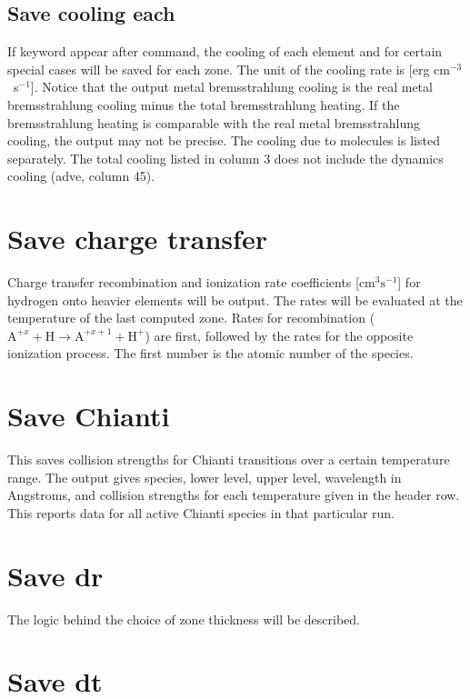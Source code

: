 \subsection{Save cooling each}

If keyword  appear after 
command, the cooling of each element and for certain
special cases will be saved for each zone. 
The unit of the cooling rate is [erg cm$^{-3}$~s$^{-1}$]. 
Notice that the output metal bremsstrahlung cooling is the real 
metal bremsstrahlung cooling minus the total bremsstrahlung heating. If the
bremsstrahlung heating is comparable with the real metal bremsstrahlung cooling,
the output may not be precise.
The cooling due to molecules is listed separately. The total cooling
listed in column 3 does not include the dynamics cooling (adve, column 45).

\section{Save charge transfer}

Charge transfer recombination and ionization rate coefficients
   [cm$^3\mathrm{s}^{-1}$]
for hydrogen onto heavier elements will be output.  The rates will be
evaluated at the temperature of the last computed zone.  Rates for
recombination (${\mathrm{A}}^{ + x}  + {\mathrm{H}}\to{\mathrm{A}}^{ + x + 1}  + {\mathrm{H}}^
+$) are first, followed by the rates for the opposite ionization process.
The first number is the atomic number of the species.

\section{Save Chianti}
\label{sec:CommandSaveChianti}

This saves collision strengths for Chianti transitions over a certain temperature range.
The output gives species, lower level, upper level, wavelength in Angstroms, 
and collision strengths for each temperature given in the header row.
This reports data for all active Chianti species in that particular run.

\section{Save dr}

The logic behind the choice of zone thickness will be described.

\section{Save dt}

